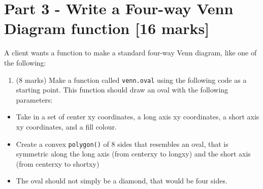 \documentclass[
]{article}
\providecommand{\tightlist}{%
  \setlength{\itemsep}{0pt}\setlength{\parskip}{0pt}}
\begin{document}
\newpage

\section{Part 3 - Write a Four-way Venn Diagram function {[}16
marks{]}}\label{part-3---write-a-four-way-venn-diagram-function-16-marks}

A client wants a function to make a standard four-way Venn diagram, like
one of the following:

\begin{enumerate}
\def\labelenumi{\alph{enumi})}
\tightlist
\item
  (8 marks) Make a function called \texttt{venn.oval} using the
  following code as a starting point. This function should draw an oval
  with the following parameters:
\end{enumerate}

\begin{itemize}
\tightlist
\item
  Take in a set of center xy coordinates, a long axis xy coordinates, a
  short axis xy coordinates, and a fill colour.
\item
  Create a convex \texttt{polygon()} of 8 sides that resembles an oval,
  that is symmetric along the long axis (from centerxy to longxy) and
  the short axis (from centerxy to shortxy)
\item
  The oval should not simply be a diamond, that would be four sides.
\end{itemize}
\end{document}
